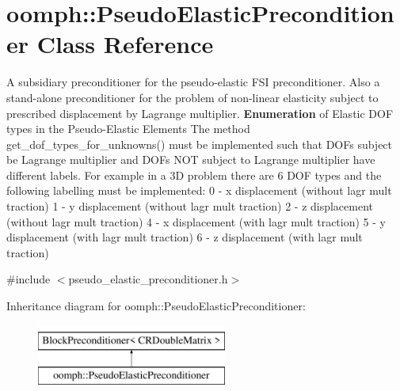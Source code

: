 \hypertarget{classoomph_1_1PseudoElasticPreconditioner}{}\section{oomph\+:\+:Pseudo\+Elastic\+Preconditioner Class Reference}
\label{classoomph_1_1PseudoElasticPreconditioner}


A subsidiary preconditioner for the pseudo-\/elastic F\+SI preconditioner. Also a stand-\/alone preconditioner for the problem of non-\/linear elasticity subject to prescribed displacement by Lagrange multiplier. {\bfseries Enumeration} of Elastic D\+OF types in the Pseudo-\/\+Elastic Elements The method get\+\_\+dof\+\_\+types\+\_\+for\+\_\+unknowns() must be implemented such that D\+O\+Fs subject be Lagrange multiplier and D\+O\+Fs N\+OT subject to Lagrange multiplier have different labels. For example in a 3D problem there are 6 D\+OF types and the following labelling must be implemented\+: 0 -\/ x displacement (without lagr mult traction) 1 -\/ y displacement (without lagr mult traction) 2 -\/ z displacement (without lagr mult traction) 4 -\/ x displacement (with lagr mult traction) 5 -\/ y displacement (with lagr mult traction) 6 -\/ z displacement (with lagr mult traction)  




{\ttfamily \#include $<$pseudo\+\_\+elastic\+\_\+preconditioner.\+h$>$}

Inheritance diagram for oomph\+:\+:Pseudo\+Elastic\+Preconditioner\+:\begin{figure}[H]
\begin{center}
\leavevmode
\includegraphics[height=2.000000cm]{classoomph_1_1PseudoElasticPreconditioner}
\end{center}
\end{figure}
